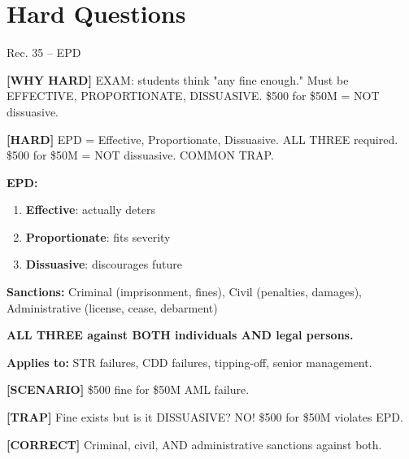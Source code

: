 \documentclass[6pt,aspectratio=169,fontsize=5pt]{beamer}
\renewcommand{\tiny}{\fontsize{3.5pt}{4.5pt}\selectfont}
\renewcommand{\normalsize}{\fontsize{7.5pt}{8.5pt}\selectfont}
\newcommand{\trap}[1]{%
	\begin{block}{\textcolor{redtrap}{\textbf{[TRAP]}}}
		\textcolor{redtrap}{\tiny #1}
	\end{block}
}
\newcommand{\scenario}[1]{%
	\begin{block}{\textbf{[SCENARIO]}}
		\tiny #1
	\end{block}
}
\newcommand{\correct}[1]{%
	\begin{block}{\textcolor{greencorrect}{\textbf{[CORRECT]}}}
		\textcolor{greencorrect}{\tiny #1}
	\end{block}
}
\newcommand{\hard}[1]{%
	\begin{block}{\textcolor{hardcolor}{\textbf{[HARD]}}}
		\textcolor{hardcolor}{\tiny #1}
	\end{block}
}
\newcommand{\hardexplain}[1]{%
	\begin{block}{\textcolor{orangehard}{\textbf{[WHY HARD]}}}
		\textcolor{orangehard}{\tiny #1}
	\end{block}
}
\begin{document}
	\section{Hard Questions}
	
	\begin{frame}{\normalsize Rec. 35 -- EPD}
		
		\hardexplain{EXAM: students think "any fine enough." Must be EFFECTIVE, PROPORTIONATE, DISSUASIVE. \$500 for \$50M = NOT dissuasive.}
		
		\hard{EPD = Effective, Proportionate, Dissuasive. ALL THREE required. \$500 for \$50M = NOT dissuasive. COMMON TRAP.}
		
		\textbf{EPD:}
		\begin{enumerate}
			\item \textbf{Effective}: actually deters
			\item \textbf{Proportionate}: fits severity
			\item \textbf{Dissuasive}: discourages future
		\end{enumerate}
		
		\textbf{Sanctions:} Criminal (imprisonment, fines), Civil (penalties, damages), Administrative (license, cease, debarment)
		
		\textbf{ALL THREE against BOTH individuals AND legal persons.}
		
		\textbf{Applies to:} STR failures, CDD failures, tipping-off, senior management.
		
		\scenario{\$500 fine for \$50M AML failure.}
		
		\trap{Fine exists but is it DISSUASIVE? NO! \$500 for \$50M violates EPD.}
		
		\correct{Criminal, civil, AND administrative sanctions against both.}
	\end{frame}
	
\end{document}
